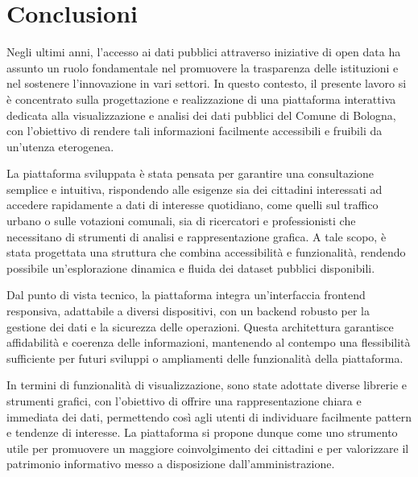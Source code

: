 \rhead[\fancyplain{}{\bfseries \leftmark}]{\fancyplain{}{\bfseries
\thepage}}

\clearpage{\pagestyle{empty}\cleardoublepage}
\chapter*{Conclusioni}
\thispagestyle{empty}

Negli ultimi anni, l'accesso ai dati pubblici attraverso iniziative di open data ha assunto un ruolo fondamentale nel promuovere la trasparenza delle istituzioni e nel sostenere l'innovazione in vari settori. In questo contesto, il presente lavoro si è concentrato sulla progettazione e realizzazione di una piattaforma interattiva dedicata alla visualizzazione e analisi dei dati pubblici del Comune di Bologna, con l'obiettivo di rendere tali informazioni facilmente accessibili e fruibili da un'utenza eterogenea.

La piattaforma sviluppata è stata pensata per garantire una consultazione semplice e intuitiva, rispondendo alle esigenze sia dei cittadini interessati ad accedere rapidamente a dati di interesse quotidiano, come quelli sul traffico urbano o sulle votazioni comunali, sia di ricercatori e professionisti che necessitano di strumenti di analisi e rappresentazione grafica. A tale scopo, è stata progettata una struttura che combina accessibilità e funzionalità, rendendo possibile un’esplorazione dinamica e fluida dei dataset pubblici disponibili.

Dal punto di vista tecnico, la piattaforma integra un'interfaccia frontend responsiva, adattabile a diversi dispositivi, con un backend robusto per la gestione dei dati e la sicurezza delle operazioni. Questa architettura garantisce affidabilità e coerenza delle informazioni, mantenendo al contempo una flessibilità sufficiente per futuri sviluppi o ampliamenti delle funzionalità della piattaforma.

In termini di funzionalità di visualizzazione, sono state adottate diverse librerie e strumenti grafici, con l'obiettivo di offrire una rappresentazione chiara e immediata dei dati, permettendo così agli utenti di individuare facilmente pattern e tendenze di interesse. La piattaforma si propone dunque come uno strumento utile per promuovere un maggiore coinvolgimento dei cittadini e per valorizzare il patrimonio informativo messo a disposizione dall'amministrazione.

